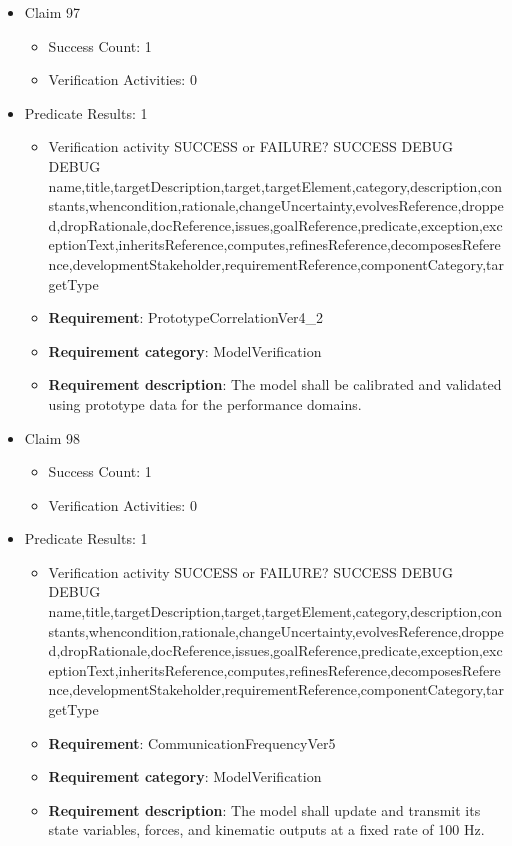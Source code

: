 \documentclass{article}
\begin{document}
\begin{itemize}
  				  \item Claim 97
				\begin{itemize}
			    	\item Success Count: 1 
			    	\item Verification Activities: 0
				\end{itemize}
				
									    
				\item Predicate Results: 1
					\begin{itemize}				
					\item Verification activity SUCCESS or FAILURE? SUCCESS
					DEBUG DEBUG name,title,targetDescription,target,targetElement,category,description,constants,whencondition,rationale,changeUncertainty,evolvesReference,dropped,dropRationale,docReference,issues,goalReference,predicate,exception,exceptionText,inheritsReference,computes,refinesReference,decomposesReference,developmentStakeholder,requirementReference,componentCategory,targetType
					\item \textbf{Requirement}: PrototypeCorrelationVer4_2 
					\item \textbf{Requirement category}: ModelVerification
					\item \textbf{Requirement description}: The model shall be calibrated and validated using prototype data for the performance domains.
					\end{itemize}

  				  \item Claim 98
				\begin{itemize}
			    	\item Success Count: 1 
			    	\item Verification Activities: 0
				\end{itemize}
				
									    
				\item Predicate Results: 1
					\begin{itemize}				
					\item Verification activity SUCCESS or FAILURE? SUCCESS
					DEBUG DEBUG name,title,targetDescription,target,targetElement,category,description,constants,whencondition,rationale,changeUncertainty,evolvesReference,dropped,dropRationale,docReference,issues,goalReference,predicate,exception,exceptionText,inheritsReference,computes,refinesReference,decomposesReference,developmentStakeholder,requirementReference,componentCategory,targetType
					\item \textbf{Requirement}: CommunicationFrequencyVer5 
					\item \textbf{Requirement category}: ModelVerification
					\item \textbf{Requirement description}: The model shall update and transmit its state variables, forces, and kinematic outputs at a fixed rate of 100 Hz.
					\end{itemize}


\end{itemize}
\end{document}
